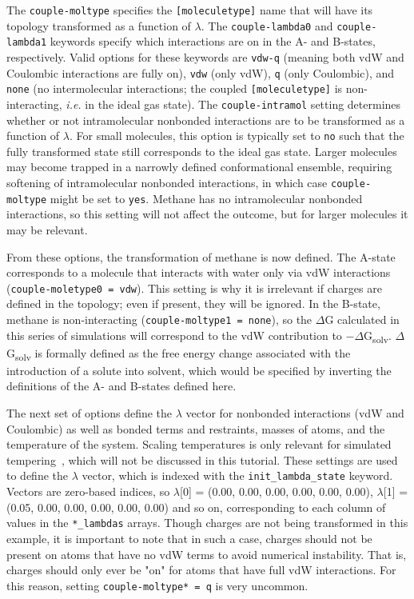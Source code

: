 \documentclass[9pt,tutorial,pubversion]{livecoms}
\begin{document}
The \texttt{couple-moltype} specifies the \texttt{[moleculetype]} name that will have its topology transformed as a function of $\lambda$. The \texttt{couple-lambda0} and \texttt{couple-lambda1} keywords specify which interactions are on in the A- and B-states, respectively. Valid options for these keywords are \texttt{vdw-q} (meaning both vdW and Coulombic interactions are fully on), \texttt{vdw} (only vdW), \texttt{q} (only Coulombic), and \texttt{none} (no intermolecular interactions; the coupled \texttt{[moleculetype]} is non-interacting, {\em i.e.} in the ideal gas state). The \texttt{couple-intramol} setting determines whether or not intramolecular nonbonded interactions are to be transformed as a function of $\lambda$. For small molecules, this option is typically set to \texttt{no} such that the fully transformed state still corresponds to the ideal gas state. Larger molecules may become trapped in a narrowly defined conformational ensemble, requiring softening of intramolecular nonbonded interactions, in which case \texttt{couple-moltype} might be set to \texttt{yes}. Methane has no intramolecular nonbonded interactions, so this setting will not affect the outcome, but for larger molecules it may be relevant.

From these options, the transformation of methane is now defined. The A-state corresponds to a molecule that interacts with water only via vdW interactions (\texttt{couple-moletype0 = vdw}). This setting is why it is irrelevant if charges are defined in the topology; even if present, they will be ignored. In the B-state, methane is non-interacting (\texttt{couple-moltype1 = none}), so the $\Delta$G calculated in this series of simulations will correspond to the vdW contribution to $-\Delta$G\textsubscript{solv}. $\Delta$G\textsubscript{solv} is formally defined as the free energy change associated with the introduction of a solute into solvent, which would be specified by inverting the definitions of the A- and B-states defined here.

The next set of options define the $\lambda$ vector for nonbonded interactions (vdW and Coulombic) as well as bonded terms and restraints, masses of atoms, and the temperature of the system. Scaling temperatures is only relevant for simulated tempering~\cite{Marinari1992,Geyer1995}, which will not be discussed in this tutorial. These settings are used to define the $\lambda$ vector, which is indexed with the \texttt{init\_lambda\_state} keyword. Vectors are zero-based indices, so $\lambda$[0] = (0.00, 0.00, 0.00, 0.00, 0.00, 0.00), $\lambda$[1] = (0.05, 0.00, 0.00, 0.00, 0.00, 0.00) and so on, corresponding to each column of values in the \texttt{*\_lambdas} arrays. Though charges are not being transformed in this example, it is important to note that in such a case, charges should not be present on atoms that have no vdW terms to avoid numerical instability. That is, charges should only ever be "on" for atoms that have full vdW interactions. For this reason, setting \texttt{couple-moltype* = q} is very uncommon.
\end{document}
